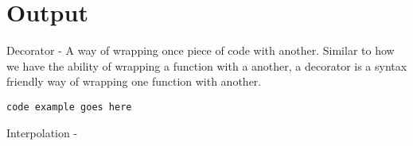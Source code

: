 
\chapter{ Output }

Decorator - A way of wrapping once piece of code with another. Similar to how we have the ability of wrapping a function with a another, a decorator is a syntax friendly way of wrapping one function with another.
\begin{lstlisting}
code example goes here
\end{lstlisting}

Interpolation - 
